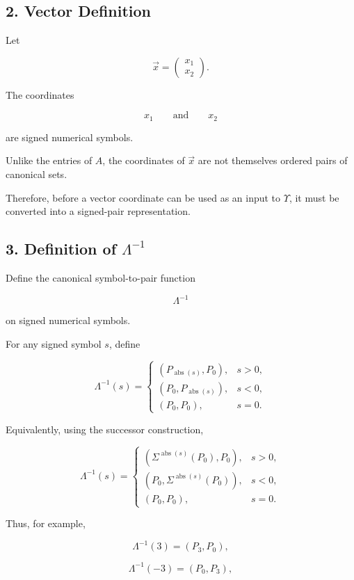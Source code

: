 \documentclass[12pt]{article}
\begin{document}
\subsection*{2. Vector Definition}

Let

\[
\vec{x}
=
\begin{pmatrix}
x_1\\
x_2
\end{pmatrix}.
\]

The coordinates

\[
x_1
\qquad\text{and}\qquad
x_2
\]

are signed numerical symbols.

Unlike the entries of \(A\), the coordinates of \(\vec{x}\) are not themselves ordered pairs of canonical sets.

Therefore, before a vector coordinate can be used as an input to \(\Upsilon\), it must be converted into a signed-pair representation.

\subsection*{3. Definition of \(\Lambda^{-1}\)}

Define the canonical symbol-to-pair function

\[
\Lambda^{-1}
\]

on signed numerical symbols.

For any signed symbol \(s\), define

\[
\boxed{
\Lambda^{-1}(s)
=
\begin{cases}
(P_{\operatorname{abs}(s)},P_0),
&
s>0,
\\[6pt]
(P_0,P_{\operatorname{abs}(s)}),
&
s<0,
\\[6pt]
(P_0,P_0),
&
s=0.
\end{cases}
}
\]

Equivalently, using the successor construction,

\[
\boxed{
\Lambda^{-1}(s)
=
\begin{cases}
\left(
\Sigma^{\operatorname{abs}(s)}(P_0),
P_0
\right),
&
s>0,
\\[8pt]
\left(
P_0,
\Sigma^{\operatorname{abs}(s)}(P_0)
\right),
&
s<0,
\\[8pt]
(P_0,P_0),
&
s=0.
\end{cases}
}
\]

Thus, for example,

\[
\Lambda^{-1}(3)=(P_3,P_0),
\]

\[
\Lambda^{-1}(-3)=(P_0,P_3),
\]
\end{document}
